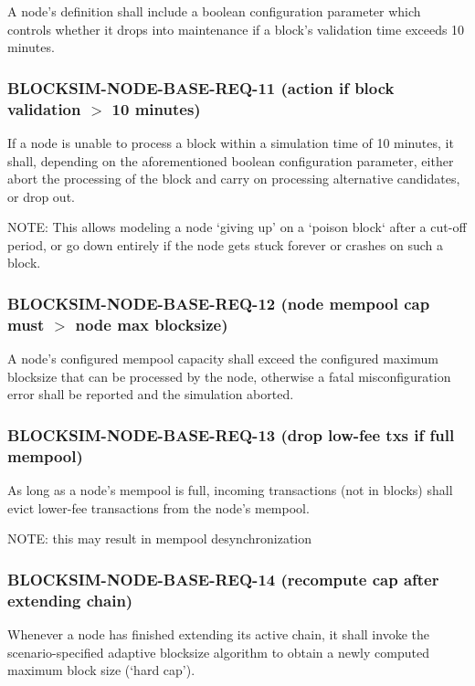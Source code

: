 \documentclass{scrreprt}
\begin{document}
        A node's definition shall include a boolean configuration parameter
        which controls whether it drops into maintenance if a block's
        validation time exceeds 10 minutes.

      \subsubsection{BLOCKSIM-NODE-BASE-REQ-11 (action if block validation $>$ 10 minutes)}

        If a node is unable to process a block within a simulation time of 10
        minutes, it shall, depending on the aforementioned  boolean configuration
        parameter, either abort the processing of the block and carry on processing
        alternative candidates, or drop out.

        NOTE: This allows modeling a node `giving up' on a `poison block` after
        a cut-off period, or go down entirely if the node gets stuck forever or
        crashes on such a block.

      \subsubsection{BLOCKSIM-NODE-BASE-REQ-12 (node mempool cap must $>$ node max blocksize)}

        A node's configured mempool capacity shall exceed the configured
        maximum blocksize that can be processed by the node, otherwise a fatal
        misconfiguration error shall be reported and the simulation aborted.

      \subsubsection{BLOCKSIM-NODE-BASE-REQ-13 (drop low-fee txs if full mempool)}

        As long as a node's mempool is full, incoming transactions (not in
        blocks) shall evict lower-fee transactions from the node's mempool.

        NOTE: this may result in mempool desynchronization

      \subsubsection{BLOCKSIM-NODE-BASE-REQ-14 (recompute cap after extending chain)}

        Whenever a node has finished extending its active chain, it shall
        invoke the scenario-specified adaptive blocksize algorithm to obtain
        a newly computed maximum block size (`hard cap').
\end{document}
